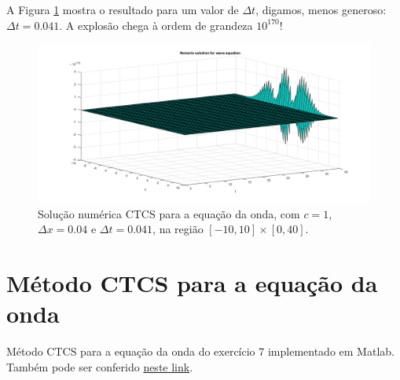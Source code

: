\documentclass{article}
\begin{document}
\begin{itemize}
            \clearpage

            A Figura \ref{fig:wave_5} mostra o resultado para um valor de
            $\Delta t$, digamos, menos generoso: $\Delta t = 0.041$. A explosão
            chega à ordem de grandeza $10^{170}$!

            \begin{figure}[!h]
                \centerline{
                    \includegraphics[width=1.4\textwidth]{images/wave_5.png}
                }
                \caption{Solução numérica CTCS para a equação da onda, com $c = 1$,
                $\Delta x = 0.04$ e $\Delta t = 0.041$, na região $[-10, 10] \times [0, 40]$.}
                \label{fig:wave_5}
            \end{figure}


    \end{itemize}

    \clearpage

    \appendix

    \section{Método CTCS para a equação da onda}
        \label{appendix:ctcs}

        Método CTCS para a equação da onda do exercício 7 implementado
        em Matlab.
        Também pode ser conferido
        \href{https://github.com/lucasresck/introduction-to-numerical-analysis/blob/master/list_5/ctcs_7.m}{neste link}.
\end{document}
